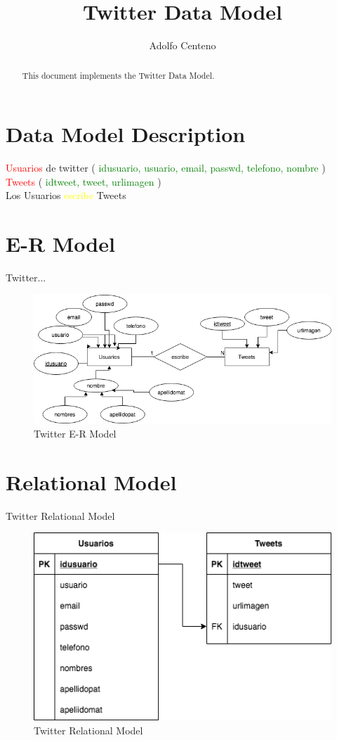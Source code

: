 \documentclass[10pt]{article}         %
\title{Twitter Data Model}
\author{Adolfo Centeno}
\begin{document}
\maketitle

\begin{abstract}
This document implements the Twitter Data Model.
\end{abstract}

\section{Data Model Description}



\textcolor{red}{Usuarios} de twitter (\textcolor{green}{ idusuario, usuario, email, passwd, telefono, nombre } ) \\
\textcolor{red}{Tweets}  (\textcolor{green}{ idtweet, tweet, urlimagen} ) \\

Los Usuarios \textcolor{yellow}{escribe} Tweets 


\section{E-R Model}

Twitter...

\begin{figure}[h]
     \includegraphics[scale=0.6]{er_twitter}
     \caption{Twitter E-R Model}
\end{figure}
   
\section{Relational Model}
Twitter Relational Model

\begin{figure}[h]
     \includegraphics[scale=0.4]{relational_twitter}
     \caption{Twitter Relational Model}
\end{figure}
\end{document}
